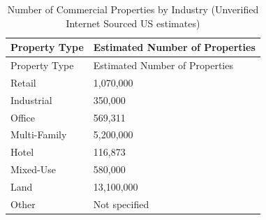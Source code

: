 \documentclass[
  12pt]{article}
\begin{document}
\begin{figure}


\caption{\label{fig-prop3}}

\end{figure}%

\begin{longtable}[]{@{}ll@{}}
\caption{Number of Commercial Properties by Industry (Unverified
Internet Sourced US estimates)}\label{tbl-Industry}\tabularnewline
\toprule\noalign{}
Property Type & Estimated Number of Properties \\
\midrule\noalign{}
\endfirsthead
\toprule\noalign{}
Property Type & Estimated Number of Properties \\
\midrule\noalign{}
\endhead
\bottomrule\noalign{}
\endlastfoot
Retail & 1,070,000 \\
Industrial & 350,000 \\
Office & 569,311 \\
Multi-Family & 5,200,000 \\
Hotel & 116,873 \\
Mixed-Use & 580,000 \\
Land & 13,100,000 \\
Other & Not specified \\
\end{longtable}
\end{document}
